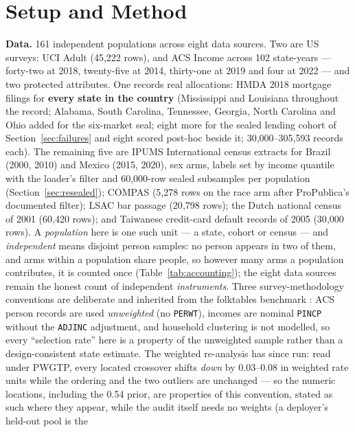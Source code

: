 \documentclass[9pt,conference]{IEEEtran}
\begin{document}
\section{Setup and Method}
\label{sec:setup}

\textbf{Data.} 161 independent populations across eight data sources.
Two are US surveys: UCI Adult (45{,}222 rows), and ACS Income \cite{ding2021} across
102 state-years --- forty-two at 2018, twenty-five at 2014, thirty-one at 2019 and four at
2022 --- and two protected attributes. One records real allocations: HMDA 2018 mortgage
filings for \textbf{every state in the country} (Mississippi and Louisiana throughout the record; Alabama,
South Carolina, Tennessee, Georgia, North Carolina and Ohio added for the six-market seal;
eight more for the sealed lending cohort of Section~\ref{sec:failures} and eight scored
post-hoc beside it; 30{,}000--305{,}593 records each). The remaining five are
IPUMS International census extracts for Brazil (2000, 2010) and Mexico (2015, 2020), sex
arms, labels set by income quantile with the loader's filter and 60{,}000-row sealed
subsamples per population (Section~\ref{sec:resealed}); COMPAS \cite{propublica2016}
(5{,}278 rows on the race arm after ProPublica's documented filter); LSAC bar passage
(20{,}798 rows); the Dutch national census of 2001 (60{,}420 rows); and Taiwanese
credit-card default records of 2005 (30{,}000 rows). A
\emph{population} here is one such unit --- a state, cohort or census --- and
\emph{independent} means disjoint person samples: no person appears in two of them, and
arms within a population share people, so however many arms a population contributes, it
is counted once (Table~\ref{tab:accounting}); the eight data sources remain the honest
count of independent \emph{instruments}. Three survey-methodology conventions are
deliberate and inherited from the folktables benchmark \cite{ding2021}: ACS person records
are used \emph{unweighted} (no \texttt{PERWT}), incomes are nominal \texttt{PINCP} without
the \texttt{ADJINC} adjustment, and household clustering is not modelled, so every
``selection rate'' here is a property of the unweighted sample rather than a
design-consistent state estimate. The weighted re-analysis has since run: read under
PWGTP, every located crossover shifts \emph{down} by 0.03--0.08 in weighted rate units
while the ordering and the two outliers are unchanged --- so the numeric locations,
including the 0.54 prior, are properties of this convention, stated as such where they
appear, while the audit itself needs no weights (a deployer's held-out pool is the
\end{document}
